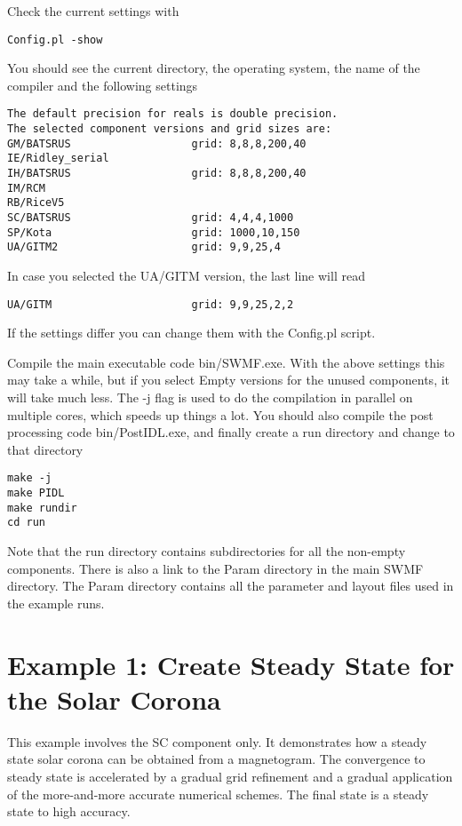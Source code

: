 Check the current settings with
\begin{verbatim}
Config.pl -show
\end{verbatim}
You should see the current directory, the operating system, the name
of the compiler and the following settings
\begin{verbatim}
The default precision for reals is double precision.
The selected component versions and grid sizes are:
GM/BATSRUS                   grid: 8,8,8,200,40
IE/Ridley_serial             
IH/BATSRUS                   grid: 8,8,8,200,40
IM/RCM                       
RB/RiceV5                    
SC/BATSRUS                   grid: 4,4,4,1000
SP/Kota                      grid: 1000,10,150
UA/GITM2                     grid: 9,9,25,4
\end{verbatim}
In case you selected the UA/GITM version, the last line will read
\begin{verbatim}
UA/GITM                      grid: 9,9,25,2,2
\end{verbatim}
If the settings differ you can change them with the Config.pl script.

Compile the main executable code bin/SWMF.exe. With the above
settings this may take a while, but if you select Empty versions
for the unused components, it will take much less.
The -j flag is used to do the compilation in parallel on multiple
cores, which speeds up things a lot.
You should also compile the post processing code bin/PostIDL.exe,
and finally create a run directory and change to that directory
\begin{verbatim}
make -j
make PIDL
make rundir
cd run
\end{verbatim}
Note that the run directory contains subdirectories for all the
non-empty components. There is also a link to the Param directory
in the main SWMF directory. The Param directory contains all the
parameter and layout files used in the example runs.

\section{Example 1: Create Steady State for the Solar Corona}

This example involves the SC component only. It demonstrates
how a steady state solar corona can be obtained from
a magnetogram. The convergence to steady state is accelerated by 
a gradual grid refinement and a gradual application of the
more-and-more accurate numerical schemes. The final state
is a steady state to high accuracy. 

